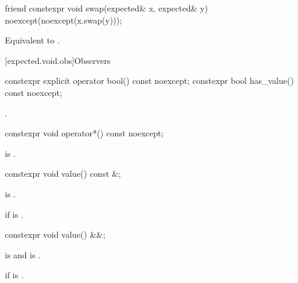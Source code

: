%
\begin{itemdecl}
friend constexpr void swap(expected& x, expected& y) noexcept(noexcept(x.swap(y)));
\end{itemdecl}

\begin{itemdescr}
\pnum
\effects
Equivalent to .
\end{itemdescr}

[expected.void.obs]{Observers}

%
%
\begin{itemdecl}
constexpr explicit operator bool() const noexcept;
constexpr bool has_value() const noexcept;
\end{itemdecl}

\begin{itemdescr}
\pnum
\returns
{}.
\end{itemdescr}

%
\begin{itemdecl}
constexpr void operator*() const noexcept;
\end{itemdecl}

\begin{itemdescr}
\pnum
\hardexpects
{} is .
\end{itemdescr}

%
\begin{itemdecl}
constexpr void value() const &;
\end{itemdecl}

\begin{itemdescr}
\pnum
\mandates
{} is .

\pnum
\throws
{} if  is .
\end{itemdescr}

%
\begin{itemdecl}
constexpr void value() &&;
\end{itemdecl}

\begin{itemdescr}
\pnum
\mandates
{} is  and
 is .

\pnum
\throws
{}
if  is .
\end{itemdescr}

